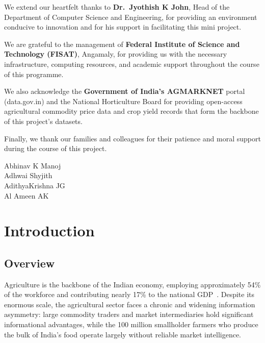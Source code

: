 \documentclass[12pt,a4paper]{report}
\begin{document}
We extend our heartfelt thanks to \textbf{Dr.~Jyothish K John}, Head of the Department
of Computer Science and Engineering, for providing an environment conducive to innovation
and for his support in facilitating this mini project.

We are grateful to the management of \textbf{Federal Institute of Science and Technology
(FISAT)}, Angamaly, for providing us with the necessary infrastructure, computing resources,
and academic support throughout the course of this programme.

We also acknowledge the \textbf{Government of India's AGMARKNET} portal (data.gov.in)
and the National Horticulture Board for providing open-access agricultural commodity price
data and crop yield records that form the backbone of this project's datasets.

Finally, we thank our families and colleagues for their patience and moral support during
the course of this project.

\begin{flushright}
Abhinav K Manoj\\
Adhwai Shyjith\\
AdithyaKrishna JG\\
Al Ameen AK
\end{flushright}

\newpage
\tableofcontents
\newpage
\listoffigures
\newpage
\listoftables

\chapter{Introduction}

\section{Overview}

Agriculture is the backbone of the Indian economy, employing approximately 54\% of the
workforce and contributing nearly 17\% to the national GDP~\cite{agricultureGDP}. Despite
its enormous scale, the agricultural sector faces a chronic and widening information
asymmetry: large commodity traders and market intermediaries hold significant informational
advantages, while the 100 million smallholder farmers who produce the bulk of India's food
operate largely without reliable market intelligence.
\end{document}
